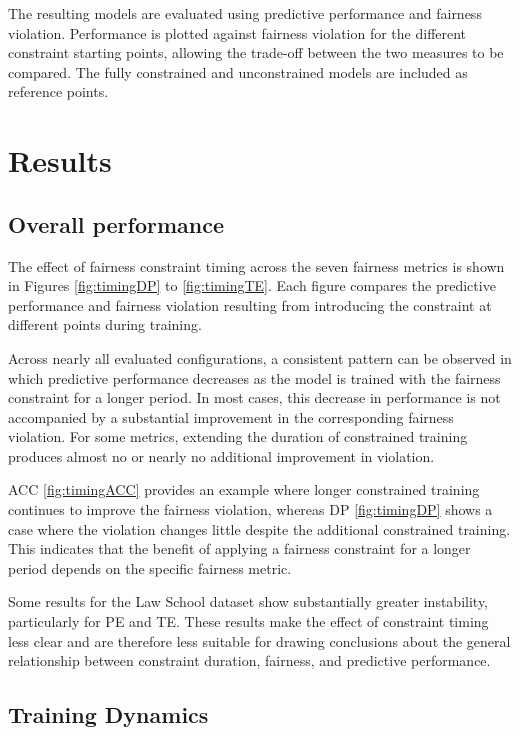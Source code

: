 The resulting models are evaluated using predictive performance and fairness violation. Performance is plotted against fairness violation for the different constraint starting points, allowing the trade-off between the two measures to be compared. The fully constrained and unconstrained models are included as reference points.

\section{Results}
\subsection{Overall performance}
The effect of fairness constraint timing across the seven fairness metrics is shown in Figures \ref{fig:timingDP} to \ref{fig:timingTE}. Each figure compares the predictive performance and fairness violation resulting from introducing the constraint at different points during training.

Across nearly all evaluated configurations, a consistent pattern can be observed in which predictive performance decreases as the model is trained with the fairness constraint for a longer period. In most cases, this decrease in performance is not accompanied by a substantial improvement in the corresponding fairness violation. For some metrics, extending the duration of constrained training produces almost no or nearly no additional improvement in violation.

ACC \ref{fig:timingACC} provides an example where longer constrained training continues to improve the fairness violation, whereas DP \ref{fig:timingDP} shows a case where the violation changes little despite the additional constrained training. This indicates that the benefit of applying a fairness constraint for a longer period depends on the specific fairness metric.

Some results for the Law School dataset show substantially greater instability, particularly for PE and TE. These results make the effect of constraint timing less clear and are therefore less suitable for drawing conclusions about the general relationship between constraint duration, fairness, and predictive performance.



\subsection{Training Dynamics}

